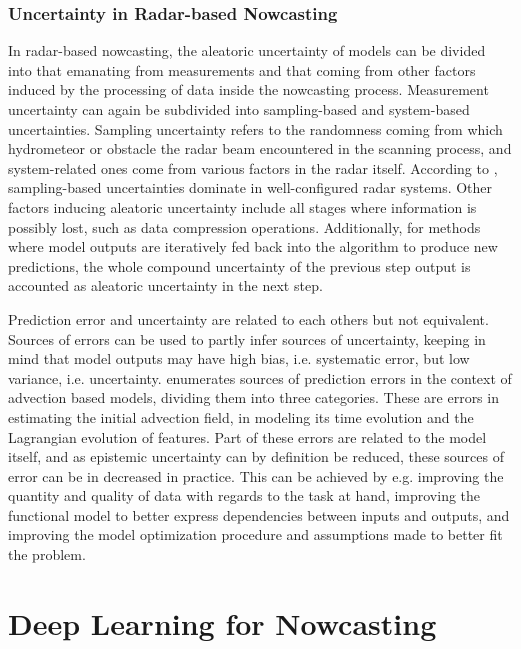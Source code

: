 \subsubsection*{Uncertainty in Radar-based Nowcasting}

In radar-based nowcasting, the aleatoric uncertainty of models can be divided into that emanating from measurements and that coming from other factors induced by the processing of data inside the nowcasting process. Measurement uncertainty can again be subdivided into sampling-based and system-based uncertainties. Sampling uncertainty refers to the randomness coming from which hydrometeor or obstacle the radar beam encountered in the scanning process, and system-related ones come from various factors in the radar itself. According to \citet{cao_measurement_2016}, sampling-based uncertainties dominate in well-configured radar systems. Other factors inducing aleatoric uncertainty include all stages where information is possibly lost, such as data compression operations. Additionally, for methods where model outputs are iteratively fed back into the algorithm to produce new predictions, the whole compound uncertainty of the previous step output is accounted as aleatoric uncertainty in the next step. 


Prediction error and uncertainty are related to each others but not equivalent. Sources of errors can be used to partly infer sources of uncertainty, keeping in mind that model outputs may have high bias, i.e. systematic error, but low variance, i.e. uncertainty. \citet{bowler_steps_2006} enumerates sources of prediction errors in the context of advection based models, dividing them into three categories. These are errors in estimating the initial advection field, in modeling its time evolution and the Lagrangian evolution of features. Part of these errors are related to the model itself, and as epistemic uncertainty can by definition be reduced, these sources of error can be in decreased in practice. This can be achieved by e.g. improving the quantity and quality of data with regards to the task at hand, improving the functional model to better express dependencies between inputs and outputs, and improving the model optimization procedure and assumptions made to better fit the problem.%



\section{Deep Learning for Nowcasting}
\label{section:dl_for_nc}

